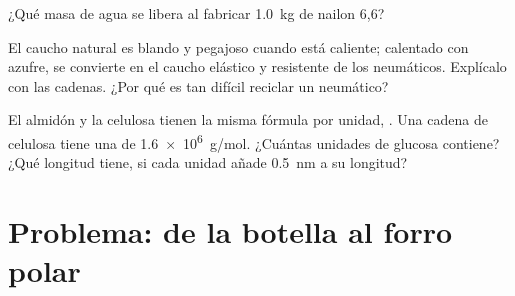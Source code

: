 \begin{exercise}[$\star\star\star$]\label{exo:g12:polymers:13}
¿Qué masa de agua se libera al fabricar \qty{1.0}{kg} de nailon 6,6?
\end{exercise}

\begin{exercise}[$\star\star\star$]\label{exo:g12:polymers:14}
El caucho natural es blando y pegajoso cuando está caliente; calentado
con azufre, se convierte en el caucho elástico y resistente de los
neumáticos. Explícalo con las cadenas. ¿Por qué es tan difícil reciclar
un neumático?
\end{exercise}

\begin{exercise}[$\star\star\star$]\label{exo:g12:polymers:15}
El almidón y la celulosa tienen la misma fórmula por unidad,
. Una cadena de celulosa tiene una  de
\qty{1.6e6}{g/mol}. ¿Cuántas unidades de glucosa contiene? ¿Qué longitud
tiene, si cada unidad añade \qty{0.5}{nm} a su longitud?
\end{exercise}

\section{Problema: de la botella al forro polar}

